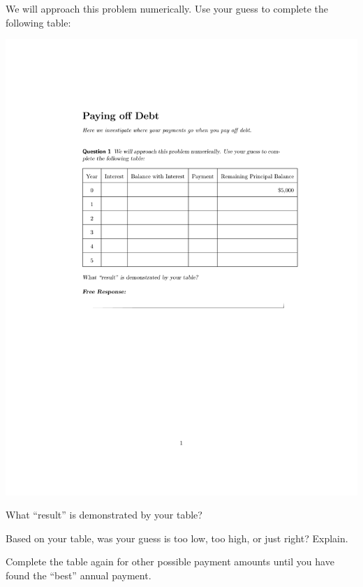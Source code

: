 \documentclass[,nooutcomes]{ximera}
\begin{document}
\begin{question}
We will approach this problem numerically.  Use your guess to complete the following table:  

\includegraphics{payingOffDebtTableGraphic.pdf}
 
What ``result'' is demonstrated by your table?  
\begin{freeResponse}
\end{freeResponse}
\end{question}

\begin{question}
Based on your table, was your guess is too low, too high, or just right?  Explain.  
\end{question}

\begin{question}
Complete the table again for other possible payment amounts until you have found the ``best'' annual payment.  
\begin{freeResponse}
\end{freeResponse}
\end{question}
\end{document}
